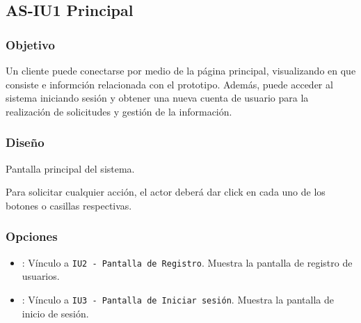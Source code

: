 %

\subsection{AS-IU1 Principal}

\subsubsection{Objetivo}
	Un cliente puede conectarse por medio de la página 
principal, visualizando en que consiste e informción relacionada con el 
prototipo. Además, puede acceder al sistema iniciando sesión y obtener una nueva 
cuenta de usuario para la realización de solicitudes y gestión de la 
información.

\subsubsection{Diseño}

{Pantalla principal del sistema.} 

	Para solicitar cualquier acción, el actor deberá dar click en cada uno 
de los botones o casillas respectivas.

\subsubsection{Opciones}
\begin{itemize}
	\item {}: Vínculo a \texttt{IU2 - Pantalla de 
	Registro}. Muestra la pantalla de registro de usuarios.
	\item {}: Vínculo a \texttt{IU3 - Pantalla de 
	Iniciar sesión}. Muestra la pantalla de inicio de sesión.
\end{itemize}
